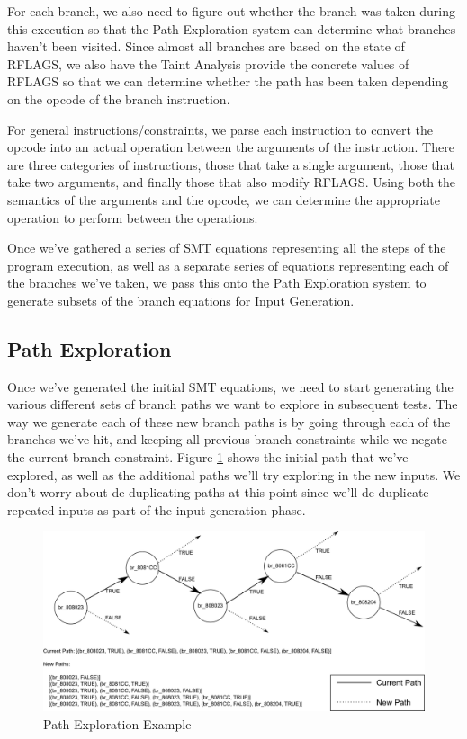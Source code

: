 For each branch, we also need to figure out whether the branch was taken during
this execution so that the Path Exploration system can determine what branches
haven't been visited. Since almost all branches are based on the state of
RFLAGS, we also have the Taint Analysis provide the concrete values of RFLAGS so
that we can determine whether the path has been taken depending on the opcode of
the branch instruction.

For general instructions/constraints, we parse each instruction to convert the
opcode into an actual operation between the arguments of the instruction. There
are three categories of instructions, those that take a single argument, those
that take two arguments, and finally those that also modify RFLAGS. Using both
the semantics of the arguments and the opcode, we can determine the appropriate
operation to perform between the operations.

Once we've gathered a series of SMT equations representing all the steps of the
program execution, as well as a separate series of equations representing each
of the branches we've taken, we pass this onto the Path Exploration system to
generate subsets of the branch equations for Input Generation.

\subsection{Path Exploration}
Once we've generated the initial SMT equations, we need to start generating the
various different sets of branch paths we want to explore in subsequent
tests. The way we generate each of these new branch paths is by going through
each of the branches we've hit, and keeping all previous branch constraints
while we negate the current branch constraint. Figure \ref{figure:pathexplore}
shows the initial path that we've explored, as well as the additional paths
we'll try exploring in the new inputs. We don't worry about de-duplicating paths
at this point since we'll de-duplicate repeated inputs as part of the input
generation phase.

\begin{figure}[ht]
 \centering
 \includegraphics{pathexplore}
 \caption{Path Exploration Example}
 \label{figure:pathexplore}
\end{figure}

